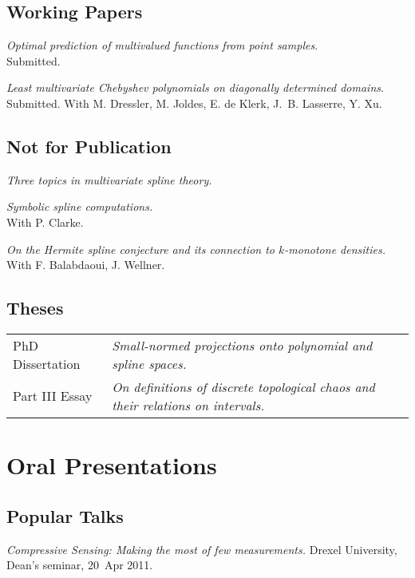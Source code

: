 \documentclass[11pt]{article}
\begin{document}
\subsection{Working Papers}
\betaremune
\item {\sl Optimal prediction of multivalued functions from point samples}.\\
Submitted.
\item {\sl Least multivariate Chebyshev polynomials on diagonally determined domains}.\\
Submitted. With M.  Dressler, M.  Joldes, E. de Klerk, J.~B. Lasserre,  Y. Xu.
\eetaremune

\subsection{Not for Publication}
\betaremune
\item {\sl Three topics in multivariate spline theory.}
\item {\sl Symbolic spline computations.}\\
 With P. Clarke.
\item {\sl On the Hermite spline conjecture and its connection to $k$-monotone densities.}\\
With F. Balabdaoui, J. Wellner.
\eetaremune

\subsection{Theses}
\begin{tabular}{ll}
PhD Dissertation & {\sl Small-normed projections onto polynomial and spline spaces.}\\
Part III Essay & {\sl On definitions of discrete topological chaos and their relations on intervals.}
\end{tabular}


\section{Oral Presentations}

\subsection{Popular Talks}
\betaremune
\item {\sl Compressive Sensing: Making the most of few measurements.}
Drexel University, Dean's seminar, 20~Apr 2011.
\eetaremune
\end{document}
